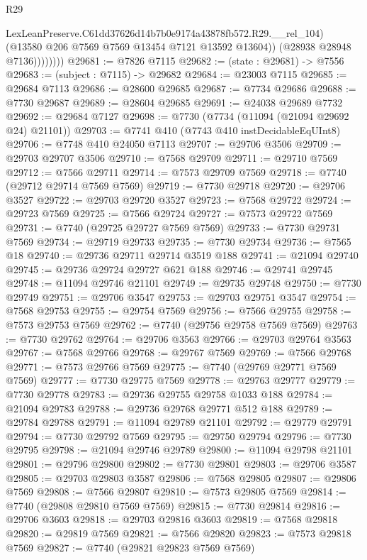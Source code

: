 \begin{lexlean}{R29}
\begin{coremodule}
                      LexLeanPreserve.C61dd37626d14b7b0e9174a43878fb572.R29.__rel_104)
                    (@13580 @206 @7569 @7569 @13454 @7121 @13592 @13604))
                  (@28938 @28948 @7136))))))))
@29681 := @7826 @7115
@29682 := (state : @29681) -> @7556
@29683 := (subject : @7115) -> @29682
@29684 := @23003 @7115
@29685 := @29684 @7113
@29686 := @28600 @29685
@29687 := @7734 @29686
@29688 := @7730 @29687
@29689 := @28604 @29685
@29691 := @24038 @29689 @7732
@29692 := @29684 @7127
@29698 := @7730 (@7734 (@11094 (@21094 @29692 @24) @21101))
@29703 := @7741 @410 (@7743 @410 instDecidableEqUInt8)
@29706 := @7748 @410 @24050 @7113
@29707 := @29706 @3506
@29709 := @29703 @29707 @3506
@29710 := @7568 @29709
@29711 := @29710 @7569
@29712 := @7566 @29711
@29714 := @7573 @29709 @7569
@29718 := @7740 (@29712 @29714 @7569 @7569)
@29719 := @7730 @29718
@29720 := @29706 @3527
@29722 := @29703 @29720 @3527
@29723 := @7568 @29722
@29724 := @29723 @7569
@29725 := @7566 @29724
@29727 := @7573 @29722 @7569
@29731 := @7740 (@29725 @29727 @7569 @7569)
@29733 := @7730 @29731 @7569
@29734 := @29719 @29733
@29735 := @7730 @29734
@29736 := @7565 @18
@29740 := @29736 @29711 @29714 @3519 @188
@29741 := @21094 @29740
@29745 := @29736 @29724 @29727 @621 @188
@29746 := @29741 @29745
@29748 := @11094 @29746 @21101
@29749 := @29735 @29748
@29750 := @7730 @29749
@29751 := @29706 @3547
@29753 := @29703 @29751 @3547
@29754 := @7568 @29753
@29755 := @29754 @7569
@29756 := @7566 @29755
@29758 := @7573 @29753 @7569
@29762 := @7740 (@29756 @29758 @7569 @7569)
@29763 := @7730 @29762
@29764 := @29706 @3563
@29766 := @29703 @29764 @3563
@29767 := @7568 @29766
@29768 := @29767 @7569
@29769 := @7566 @29768
@29771 := @7573 @29766 @7569
@29775 := @7740 (@29769 @29771 @7569 @7569)
@29777 := @7730 @29775 @7569
@29778 := @29763 @29777
@29779 := @7730 @29778
@29783 := @29736 @29755 @29758 @1033 @188
@29784 := @21094 @29783
@29788 := @29736 @29768 @29771 @512 @188
@29789 := @29784 @29788
@29791 := @11094 @29789 @21101
@29792 := @29779 @29791
@29794 := @7730 @29792 @7569
@29795 := @29750 @29794
@29796 := @7730 @29795
@29798 := @21094 @29746 @29789
@29800 := @11094 @29798 @21101
@29801 := @29796 @29800
@29802 := @7730 @29801
@29803 := @29706 @3587
@29805 := @29703 @29803 @3587
@29806 := @7568 @29805
@29807 := @29806 @7569
@29808 := @7566 @29807
@29810 := @7573 @29805 @7569
@29814 := @7740 (@29808 @29810 @7569 @7569)
@29815 := @7730 @29814
@29816 := @29706 @3603
@29818 := @29703 @29816 @3603
@29819 := @7568 @29818
@29820 := @29819 @7569
@29821 := @7566 @29820
@29823 := @7573 @29818 @7569
@29827 := @7740 (@29821 @29823 @7569 @7569)

\end{coremodule}
\end{lexlean}
